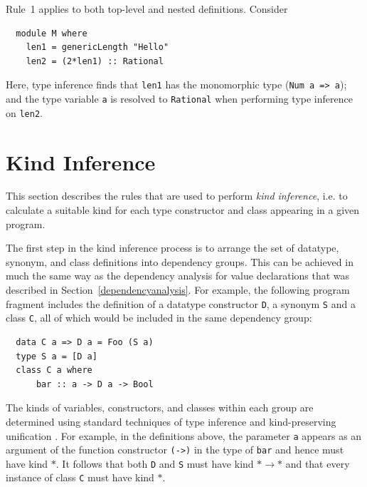 Rule~1 applies to both top-level and nested definitions.  Consider
\bprog
{\small\begin{verbatim}
  module M where
    len1 = genericLength "Hello"
    len2 = (2*len1) :: Rational
\end{verbatim}}
\eprog
Here, type inference finds that \mbox{\tt len1} has the monomorphic type (\mbox{\tt Num\ a\ =>\ a});
and the type variable \mbox{\tt a} is resolved to \mbox{\tt Rational} when performing type
inference on \mbox{\tt len2}.

% 
% 
% 

\section{Kind Inference}
\label{kindinference}

This section describes the rules that are used to perform {\em kind
inference}, i.e. to calculate a suitable kind for each type
constructor and class appearing in a given
program.

The first step in the kind inference process is to arrange the set of
datatype, synonym, and class definitions into dependency groups.  This can
be achieved in much the same way as the dependency analysis for value
declarations that was described in Section~\ref{dependencyanalysis}.
For example, the following program fragment includes the definition
of a datatype constructor \mbox{\tt D}, a synonym \mbox{\tt S} and a class \mbox{\tt C}, all of
which would be included in the same dependency group:
\bprog
{\small\begin{verbatim}
  data C a => D a = Foo (S a)
  type S a = [D a]
  class C a where
      bar :: a -> D a -> Bool
\end{verbatim}}
\eprog
The kinds of variables, constructors, and classes within each group
are determined using standard techniques of type inference and
kind-preserving unification \cite{jones:cclasses}.  For example, in the
definitions above, the parameter \mbox{\tt a} appears as an argument of the
function constructor \mbox{\tt (->)} in the type of \mbox{\tt bar} and hence must
have kind $\ast$.  It follows that both \mbox{\tt D} and \mbox{\tt S} must have
kind $\ast\rightarrow\ast$ and that every instance of class \mbox{\tt C} must
have kind $\ast$.

